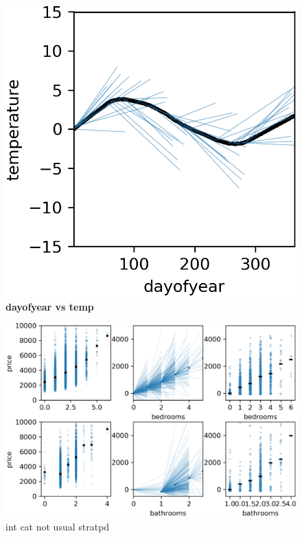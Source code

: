 \documentclass[12pt]{article}
\begin{document}
\begin{figure}[htbp]
\begin{center}
\includegraphics[scale=0.7]{images/dayofyear_vs_temp_stratpd.png}
\caption{{\bf  dayofyear  vs temp}}
\label{fig:dayofyear_vs_temp}
\end{center}
\end{figure}

\begin{figure}[htbp]
\begin{center}
\includegraphics[scale=0.7]{images/rent_intcat.png}
\caption{int cat not usual stratpd}
\label{fig:rent_intcat}
\end{center}
\end{figure}
\end{document}
